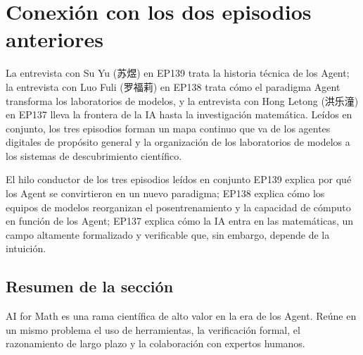 \section{Conexión con los dos episodios anteriores}

La entrevista con Su Yu (苏煜) en EP139 trata la historia técnica de los Agent; la entrevista con Luo Fuli (罗福莉) en EP138 trata cómo el paradigma Agent transforma los laboratorios de modelos, y la entrevista con Hong Letong (洪乐潼) en EP137 lleva la frontera de la IA hasta la investigación matemática. Leídos en conjunto, los tres episodios forman un mapa continuo que va de los agentes digitales de propósito general y la organización de los laboratorios de modelos a los sistemas de descubrimiento científico.

\begin{importantbox}{El hilo conductor de los tres episodios leídos en conjunto}
EP139 explica por qué los Agent se convirtieron en un nuevo paradigma; EP138 explica cómo los equipos de modelos reorganizan el posentrenamiento y la capacidad de cómputo en función de los Agent; EP137 explica cómo la IA entra en las matemáticas, un campo altamente formalizado y verificable que, sin embargo, depende de la intuición.
\end{importantbox}

\subsection{Resumen de la sección}

AI for Math es una rama científica de alto valor en la era de los Agent. Reúne en un mismo problema el uso de herramientas, la verificación formal, el razonamiento de largo plazo y la colaboración con expertos humanos.

